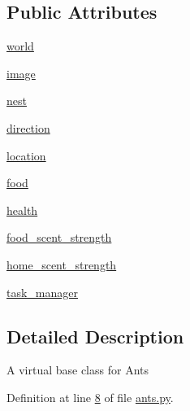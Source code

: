 \subsection*{Public Attributes}
\begin{DoxyCompactItemize}
\item 
\hyperlink{classants_1_1Ant_a55f64c7cafb3806bdcfda42586adbff5}{world}
\item 
\hyperlink{classants_1_1Ant_adf5f970b6b5e8472f42275114eeac779}{image}
\item 
\hyperlink{classants_1_1Ant_acaafd510ade5c38719b8082027162132}{nest}
\item 
\hyperlink{classants_1_1Ant_ae26b7ffd236a83d8d5c96ec6ec07b4bb}{direction}
\item 
\hyperlink{classants_1_1Ant_ae7de139b6f5bdb8d4ab42755c405ef5d}{location}
\item 
\hyperlink{classants_1_1Ant_afcfbbf8bd338401378d25c512204eb91}{food}
\item 
\hyperlink{classants_1_1Ant_aa147562276c788d4533ab63ac44d96a6}{health}
\item 
\hyperlink{classants_1_1Ant_ad7fb2ac4566880fdacfd7bf7f4ec1109}{food\+\_\+scent\+\_\+strength}
\item 
\hyperlink{classants_1_1Ant_a7885f0124adf5b10fd6fa5e8ac47edb9}{home\+\_\+scent\+\_\+strength}
\item 
\hyperlink{classants_1_1Ant_a80e2218dcfabbd9ef4d83638dd20d943}{task\+\_\+manager}
\end{DoxyCompactItemize}


\subsection{Detailed Description}
\begin{DoxyVerb}A virtual base class for Ants
\end{DoxyVerb}
 

Definition at line \hyperlink{ants_8py_source_l00008}{8} of file \hyperlink{ants_8py_source}{ants.\+py}.



